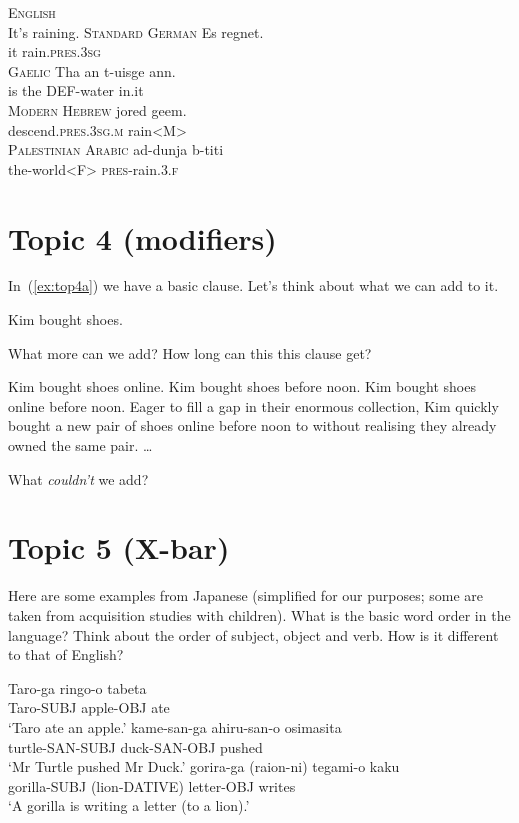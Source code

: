 \documentclass{article}
\begin{document}
\ea \label{ex:top3}
    \ea \textsc{English}\\
        It's raining.
    \ex \textsc{Standard German}
        \gll Es regnet. \\
        it rain.\textsc{pres.3sg} \\
    \ex \textsc{Gaelic} 
        \gll Tha an t-uisge ann. \\
         is the \textsc{DEF}-water in.it \\
    \ex \textsc{Modern Hebrew}
        \gll jored geem. \\
        descend.\textsc{pres.3sg.m} rain\textsc{<M>} \\
    \ex \textsc{Palestinian Arabic}
        \gll ad-dunja b-titi \\
        the-world\textsc{<F>} \textsc{pres}-rain.\textsc{3.f} \\
    \z
\z

\section{Topic 4 (modifiers)}
In~(\ref{ex:top4a}) we have a basic clause. Let's think about what we can add to it.

\ea Kim bought shoes. \label{ex:top4a}
\z

What more can we add? How long can this this clause get?

\ea
    \ea Kim bought shoes online.
    \ex Kim bought shoes before noon.
    \ex Kim bought shoes online before noon.
    \ex Eager to fill a gap in their enormous collection, Kim quickly bought a new pair of shoes online before noon to without realising they already owned the same pair.
    \ex \dots{}
    \z
\z

What \emph{couldn't} we add?


\section{Topic 5 (X-bar)}
Here are some examples from Japanese (simplified for our purposes; some are taken from acquisition studies with children). What is the basic word order in the language? Think about the order of subject, object and verb. How is it different to that of English?

\ea
    \ea \gll Taro-ga ringo-o tabeta\\
            Taro-SUBJ apple-OBJ	ate\\
        \glt `Taro ate an apple.'
    \ex \gll kame-san-ga ahiru-san-o osimasita\\
            turtle-SAN-SUBJ duck-SAN-OBJ pushed\\
        \glt `Mr Turtle pushed Mr Duck.'
    \ex \gll gorira-ga (raion-ni) tegami-o kaku\\
            gorilla-SUBJ (lion-DATIVE) letter-OBJ writes\\
        \glt `A gorilla is writing a letter (to a lion).'
    \z
\z
\end{document}
